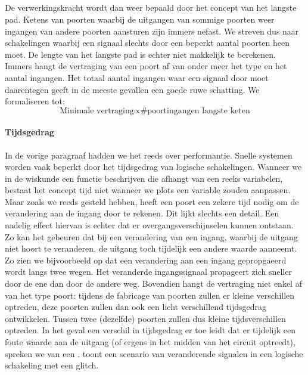 \subparagraph{}
De verwerkingskracht wordt dan weer bepaald door het concept van het langste pad. Ketens van poorten waarbij de uitgangen van sommige poorten weer ingangen van andere poorten aansturen zijn immers nefast. We streven dus naar schakelingen waarbij een signaal slechts door een beperkt aantal poorten heen moet. De lengte van het langste pad is echter niet makkelijk te berekenen. Immers hangt de vertraging van een poort af van onder meer het type en het aantal ingangen. Het totaal aantal ingangen waar een signaal door moet daarentegen geeft in de meeste gevallen een goede ruwe schatting. We formaliseren tot:
\begin{equation}
\mbox{Minimale vertraging}\propto\mbox{\#poortingangen langste keten}
\end{equation}

\paragraph{Tijdsgedrag}
In de vorige paragraaf hadden we het reeds over performantie. Snelle systemen worden vaak beperkt door het tijdsgedrag van logische schakelingen. Wanneer we in de wiskunde een functie beschrijven die afhangt van een reeks variabelen, bestaat het concept tijd niet wanneer we plots een variable zouden aanpassen. Maar zoals we reeds gesteld hebben, heeft een poort een zekere tijd nodig om de verandering aan de ingang door te rekenen. Dit lijkt slechts een detail. Een nadelig effect hiervan is echter dat er overgangsverschijnselen kunnen ontstaan. Zo kan het gebeuren dat bij een verandering van een ingang, waarbij de uitgang niet hoort te veranderen, de uitgang toch tijdelijk een andere waarde aanneemt. Zo zien we bijvoorbeeld op  dat een verandering aan een ingang gepropgaeerd wordt langs twee wegen. Het veranderde ingangssignaal propageert zich sneller door de ene dan door de andere weg. Bovendien hangt de vertraging niet enkel af van het type poort: tijdens de fabricage van poorten zullen er kleine verschillen optreden, deze poorten zullen dan ook een licht verschillend tijdsgedrag ontwikkelen. Tussen twee (dezelfde) poorten zullen dus kleine tijdsverschillen optreden. In het geval een verschil in tijdsgedrag er toe leidt dat er tijdelijk een foute waarde aan de uitgang (of ergens in het midden van het circuit optreedt), spreken we van een .  toont een scenario van veranderende signalen in een logische schakeling met een glitch.

